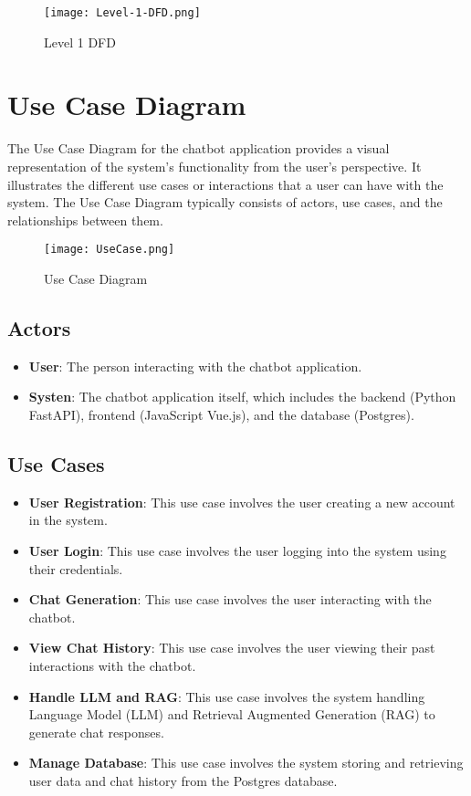 \begin{figure}[h]
  \centering
  \texttt{[image: Level-1-DFD.png]}
  \caption{Level 1 DFD}\label{fig:level-1-dfd}
\end{figure}

\section{Use Case Diagram}
The Use Case Diagram for the chatbot application provides a visual representation of the system's functionality from the user's perspective. It illustrates the different use cases or interactions that a user can have with the system. The Use Case Diagram typically consists of actors, use cases, and the relationships between them.

\begin{figure}[h]
  \centering
  \texttt{[image: UseCase.png]}
  \caption{Use Case Diagram}\label{fig:use-case-diagram}
\end{figure}

\subsection*{Actors}

\begin{itemize}
  \item \textbf{User}: The person interacting with the chatbot application.
  \item \textbf{Systen}: The chatbot application itself, which includes the backend (Python FastAPI), frontend (JavaScript Vue.js), and the database (Postgres).
\end{itemize}

\subsection*{Use Cases}

\begin{itemize}
  \item \textbf{User Registration}: This use case involves the user creating a new account in the system.
  \item \textbf{User Login}: This use case involves the user logging into the system using their credentials.
  \item \textbf{Chat Generation}: This use case involves the user interacting with the chatbot. 
  \item \textbf{View Chat History}: This use case involves the user viewing their past interactions with the chatbot.
  \item \textbf{Handle LLM and RAG}: This use case involves the system handling Language Model (LLM) and Retrieval Augmented Generation (RAG) to generate chat responses.
  \item \textbf{Manage Database}: This use case involves the system storing and retrieving user data and chat history from the Postgres database.
\end{itemize}

